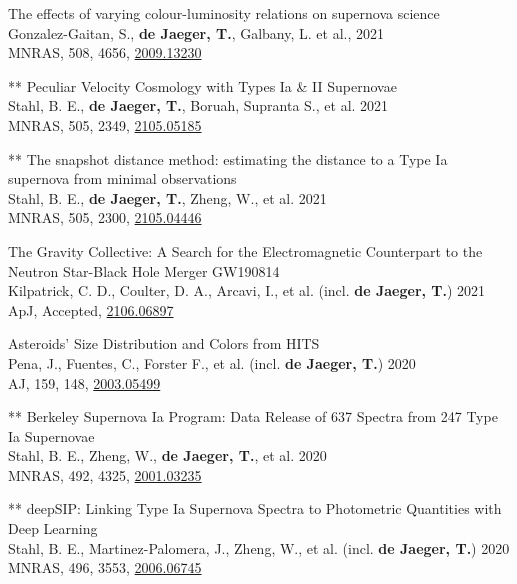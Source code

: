 \documentclass[12pt]{article}
\begin{document}
\begin{bibenum}
	\item
The effects of varying colour-luminosity relations on supernova science\\
Gonzalez-Gaitan, S., \textbf{de Jaeger, T.}, Galbany, L. et al., 2021\\
MNRAS, 508, 4656, \href{https://arxiv.org/abs/2009.13230}{2009.13230}
    \item 
** Peculiar Velocity Cosmology with Types Ia \& II Supernovae\\
Stahl, B. E., \textbf{de Jaeger, T.}, Boruah, Supranta S., et al. 2021\\
MNRAS, 505, 2349, \href{https://arxiv.org/abs/2105.05185}{2105.05185} 
    \item 
** The snapshot distance method: estimating the distance to a Type Ia supernova from minimal observations\\
Stahl, B. E., \textbf{de Jaeger, T.}, Zheng, W., et al. 2021\\
MNRAS, 505, 2300, \href{https://arxiv.org/abs/2105.04446}{2105.04446}
    \item 
The Gravity Collective: A Search for the Electromagnetic Counterpart to the Neutron Star-Black Hole Merger GW190814 \\
Kilpatrick, C. D., Coulter, D. A., Arcavi, I., et al. (incl. \textbf{de Jaeger, T.}) 2021\\
ApJ, Accepted, \href{https://arxiv.org/abs/2106.06897}{2106.06897}
    \item 
Asteroids' Size Distribution and Colors from HITS\\
Pena, J., Fuentes, C., Forster F., et al. (incl. \textbf{de Jaeger, T.}) 2020\\
AJ, 159, 148, \href{https://arxiv.org/abs/2003.05499}{2003.05499}
    \item 
** Berkeley Supernova Ia Program: Data Release of 637 Spectra from 247 Type Ia Supernovae\\
Stahl, B. E., Zheng, W., \textbf{de Jaeger, T.}, et al. 2020\\
MNRAS, 492, 4325, \href{https://arxiv.org/abs/2001.03235}{2001.03235}   
    \item 
** deepSIP: Linking Type Ia Supernova Spectra to Photometric Quantities with Deep Learning\\
Stahl, B. E., Martinez-Palomera, J., Zheng, W., et al. (incl. \textbf{de Jaeger, T.}) 2020\\
MNRAS, 496, 3553, \href{https://arxiv.org/abs/2006.06745}{2006.06745}


\end{bibenum}
\end{document}
